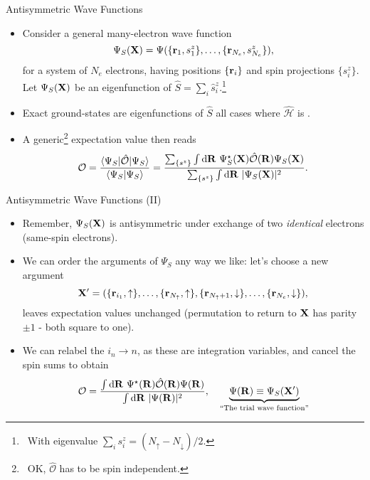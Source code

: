 \documentclass[12pt, pdf, hyperref={draft}, usenames, dvipsnames,
aspectratio=169]{beamer}
\newcommand{\dd}{\mathrm{d}}
\newcommand{\bra}[1]{\langle{#1}\rvert}
\newcommand{\blue}[1]{{\bf\color{NavyBlue}{#1}}}
\begin{document}
\begin{frame}{Antisymmetric Wave Functions}
\begin{itemize} \item Consider a general many-electron wave function
\begin{equation}
  \Psi_{S}({\bf X}) = \Psi(\{ {\bf r}_1, s^{z}_1  \},\ldots,\{ {\bf r}_{N_e},
  s^{z}_{N_e} \}),
\end{equation}
  for a system of $N_e$ electrons, having positions $\{ {\bf r}_i \}$ and spin
  projections $\{s^z_i\}$. Let $\Psi_{S}({\bf X})$ be an eigenfunction of
  $\hat S=\sum_i \hat s^{z}_i$.\footnote{\ With eigenvalue $\sum_i s^{z}_i =
  (N_{\uparrow} - N_{\downarrow})/2$.}
  \item Exact ground-states are eigenfunctions of $\hat S$ all cases where
  $\mathcal{\hat H}$ is \blue{spin-independent}.
  \item A generic\footnote{\ OK, $\mathcal{\hat O}$ has to be spin independent.}
  expectation value then reads
  \begin{equation}
    \mathcal{O} = \dfrac{\bra{\Psi_{S}} \mathcal{\hat O}  \rvert \Psi_{S}
    \rangle }{\bra{\Psi_{S}} \Psi_{S} \rangle} = \dfrac{\sum_{\{ s^z \}}\int\dd
    {\bf R}\ \Psi^{\star}_{S}({\bf X}) \mathcal{\hat O}({\bf R}) \Psi_{S}({\bf
    X})} {\sum_{\{ s^z \}}\int\dd {\bf R}\ \lvert\Psi_{S}({\bf X})\rvert^2}.
  \end{equation}
\end{itemize}
\end{frame}


\begin{frame}{Antisymmetric Wave Functions (II)}
\begin{itemize}
  \item Remember, $\Psi_{S}({\bf X})$ is antisymmetric under exchange of two
  \textit{identical} electrons (same-spin electrons).
  \item We can order the arguments of $\Psi_{S}$ any way we like: let's choose
  a new argument
  \begin{equation}
    {\bf X}' = ( \{ {\bf r}_{i_1}, \uparrow \}, \ldots, \{ {\bf
    r}_{N_\uparrow}, \uparrow \}, \{ {\bf r}_{N_{\uparrow}+1}, \downarrow \},
    \ldots, \{ {\bf r}_{N_e}, \downarrow  \}),
  \end{equation}
  leaves expectation values unchanged (permutation to return to ${\bf X}$ has
  parity $\pm1$ - both square to one).
  \item We can relabel the $i_n \rightarrow n$, as these are integration
  variables, and cancel the spin sums to obtain
  \begin{equation}
    \mathcal{O} = \dfrac{\int\dd {\bf R}\ \Psi^{\star}({\bf R})
    \mathcal{\hat O}({\bf R}) \Psi({\bf R})}{\int\dd {\bf R}\ \lvert
    \Psi({\bf R}) \rvert^2},\quad \underbrace{\Psi({\bf R})
    \equiv \Psi_{S}({\bf X'})}_{\text{``The trial wave function''}}
  \end{equation}
\end{itemize}
\end{frame}
\end{document}
